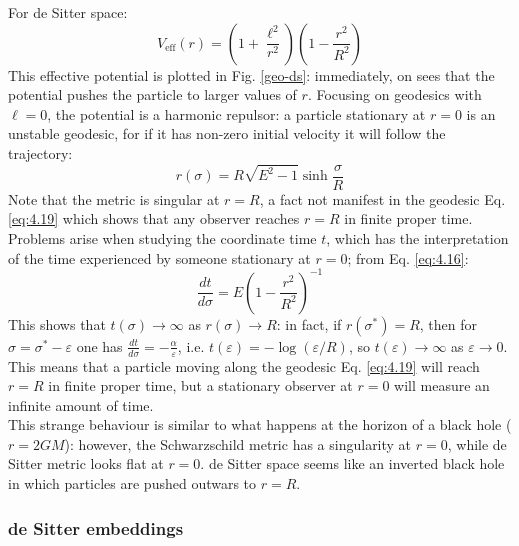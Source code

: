 For de Sitter space:
\begin{equation*}
  V_{\text{eff}}(r) = \left( 1 + \frac{\ell^2}{r^2} \right) \left( 1 - \frac{r^2}{R^2} \right)
\end{equation*}
This effective potential is plotted in Fig. \ref{geo-ds}: immediately, on sees that the potential pushes the particle to larger values of $ r $. Focusing on geodesics with $ \ell = 0 $, the potential is a harmonic repulsor: a particle stationary at $ r = 0 $ is an unstable geodesic, for if it has non-zero initial velocity it will follow the trajectory:
\begin{equation}
  r(\sigma) = R \sqrt{E^2 - 1} \sinh \frac{\sigma}{R}
  \label{eq:4.19}
\end{equation}
Note that the metric is singular at $ r = R $, a fact not manifest in the geodesic Eq. \ref{eq:4.19} which shows that any observer reaches $ r = R $ in finite proper time. Problems arise when studying the coordinate time $ t $, which has the interpretation of the time experienced by someone stationary at $ r = 0 $; from Eq. \ref{eq:4.16}:
\begin{equation*}
  \frac{dt}{d\sigma} = E \left( 1 - \frac{r^2}{R^2} \right)^{-1}
\end{equation*}
This shows that $ t(\sigma) \rightarrow \infty $ as $ r(\sigma) \rightarrow R $: in fact, if $ r(\sigma^*) = R $, then for $ \sigma = \sigma^* - \varepsilon $ one has $ \frac{dt}{d\sigma} = - \frac{\alpha}{\varepsilon} $, i.e. $ t(\varepsilon) = - \log (\varepsilon / R) $, so $ t(\varepsilon) \rightarrow \infty $ as $ \varepsilon \rightarrow 0 $. This means that a particle moving along the geodesic Eq. \ref{eq:4.19} will reach $ r = R $ in finite proper time, but a stationary observer at $ r = 0 $ will measure an infinite amount of time.\\
This strange behaviour is similar to what happens at the horizon of a black hole ($ r = 2GM $): however, the Schwarzschild metric has a singularity at $ r = 0 $, while de Sitter metric looks flat at $ r = 0 $. de Sitter space seems like an inverted black hole in which particles are pushed outwars to $ r = R $.

\subsubsection{de Sitter embeddings}

